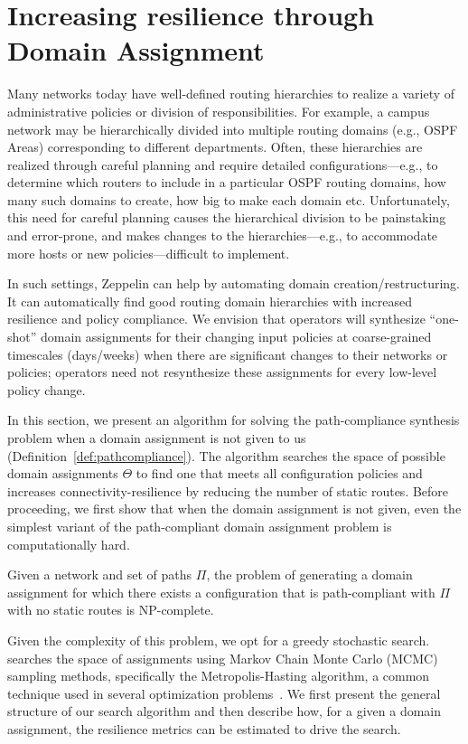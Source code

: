 \section{Increasing resilience through Domain Assignment}
\label{sec:synth-dom-ass}
Many networks today have well-defined routing hierarchies to realize a variety of administrative  policies or division of responsibilities. For example, a campus network may be hierarchically divided into multiple routing domains (e.g., OSPF Areas) corresponding to different departments. Often, these hierarchies are realized through careful planning and require detailed configurations---e.g., to determine which routers to include in a particular OSPF routing domains, how many such domains to create, how big to make each domain etc. Unfortunately, this 
need for careful planning
causes the hierarchical division to be painstaking and error-prone, and makes changes to  the hierarchies---e.g., to accommodate more hosts or new policies---difficult to implement.

In such settings, Zeppelin can help by automating domain creation/restructuring. It can automatically find good routing domain hierarchies with increased resilience and policy compliance. We envision that operators will synthesize ``one-shot'' domain assignments for their changing input policies at coarse-grained timescales (days/weeks) when there are significant changes to their networks or policies; operators need not resynthesize these assignments for every low-level policy change.


In this section, we present an algorithm for 
solving the path-compliance synthesis problem when a domain assignment is not given to us (Definition~\ref{def:pathcompliance}).
The algorithm searches the space of possible domain assignments $\Theta$ to find
one that meets all configuration policies and increases 
connectivity-resilience by reducing the number of static routes.
Before proceeding, we first show that when the domain assignment is not given,
even the simplest variant of the path-compliant domain assignment problem
is computationally hard.
\begin{theorem}
Given a
network and  set of paths  $\Pi$,
the problem of generating a domain assignment for which
there exists a 
configuration that is path-compliant with $\Pi$ with no static routes
is NP-complete.
\end{theorem}
\iffull

\fi

Given the complexity of this problem, we opt for a greedy
stochastic search.
\name searches the space of assignments using Markov
Chain Monte Carlo (MCMC) sampling methods, specifically the Metropolis-Hasting
algorithm, a common technique used in several optimization 
problems~\cite{stoke}. 
We first present the general structure of our search 
algorithm and 
then describe how, for a given a domain assignment,
the resilience metrics can be
estimated to drive the search.



